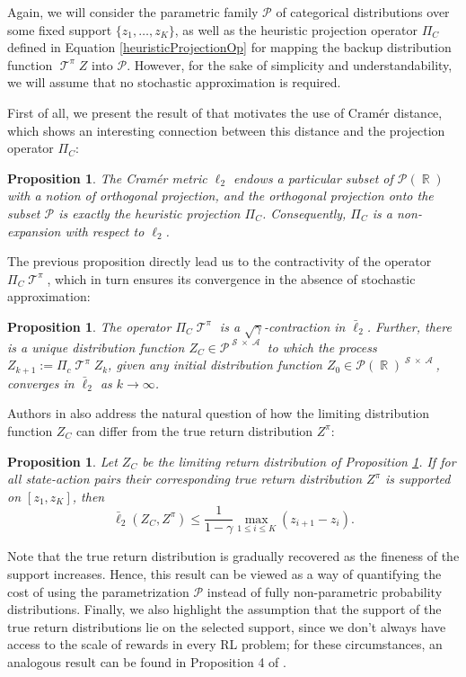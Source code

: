 \documentclass[12pt,a4paper,openright,twoside]{article}
\DeclareMathOperator*{\R}{\mathbb{R}}
\DeclareMathOperator*{\Sspace}{\mathcal{S}}
\DeclareMathOperator*{\A}{\mathcal{A}}
\DeclareMathOperator*{\T}{\mathcal{T}}
\numberwithin{equation}{section}
\newtheorem{prop}[theorem]{Proposition}
\theoremstyle{definition}
\theoremstyle{remark}
\theoremstyle{plain}
\begin{document}
Again, we will consider the parametric family $\mathcal{P}$ of categorical distributions over some fixed support $\{z_1, \dots , z_K\}$, as well as the heuristic projection operator $\Pi_C$ defined in Equation \ref{heuristicProjectionOp} for mapping the backup distribution function $\T^\pi Z$ into $\mathcal{P}$. However, for the sake of simplicity and understandability, we will assume that no stochastic approximation is required. 

First of all, we present the result of \cite{analysisC51} that motivates the use of Cramér distance, which shows an interesting connection between this distance and the projection operator $\Pi_C$:
\begin{prop} \label{CramerProj}
	The Cramér metric $\ell_2$ endows a particular subset of $\mathscr{P}(\R)$ with a notion of orthogonal projection, and the orthogonal projection onto the subset $\mathcal{P}$ is exactly the heuristic projection $\Pi_C$. Consequently, $\Pi_C$ is a non-expansion with respect to $\ell_2$.
\end{prop}

The previous proposition directly lead us to the contractivity of the operator $\Pi_C \T^\pi$, which in turn ensures its convergence in the absence of stochastic approximation:
\begin{prop} \label{CramerBellmanContraction}
	The operator $\Pi_C \T^\pi$ is a $\sqrt{\gamma}$-contraction in $\bar{\ell}_2$. Further, there is a unique distribution function $Z_C \in \mathcal{P}^{\Sspace \times \A}$ to which the process $Z_{k+1} := \Pi_c \T^\pi Z_k$, given any initial distribution function $Z_0 \in \mathscr{P}(\R)^{\Sspace \times \A}$, converges in $\bar{\ell}_2$ as $k \rightarrow \infty$.
\end{prop}

Authors in \cite{analysisC51} also address the natural question of how the limiting distribution function $Z_C$ can differ from the true return distribution $Z^\pi$:
\begin{prop} \label{errorTabular}
	Let $Z_C$ be the limiting return distribution of Proposition \ref{CramerBellmanContraction}. If for all state-action pairs their corresponding true return distribution $Z^\pi$ is supported on $[z_1,z_K]$, then 
	$$\bar{\ell}_2(Z_C, Z^\pi) \leq \frac{1}{1-\gamma} \max_{1\leq i \leq K} (z_{i+1}-z_i). $$
\end{prop}
Note that the true return distribution is gradually recovered as the fineness of the support increases. Hence, this result can be viewed as a way of quantifying the cost of using the parametrization $\mathcal{P}$ instead of fully non-parametric probability distributions. Finally, we also highlight the assumption that the support of the true return distributions lie on the selected support, since we don't always have access to the scale of rewards in every RL problem; for these circumstances, an analogous result can be found in Proposition 4 of \cite{analysisC51}.
\end{document}
